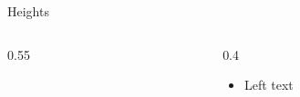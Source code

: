 \documentclass[aspectratio=169]{beamer}
\begin{document}
\begin{frame}{Heights}
\begin{columns}
\begin{column}{0.55\textwidth}
\end{column}
\begin{column}{0.4\textwidth}
\begin{itemize}
\item Left text
\end{itemize}
\end{column}
\end{columns}
\end{frame}
\end{document}

